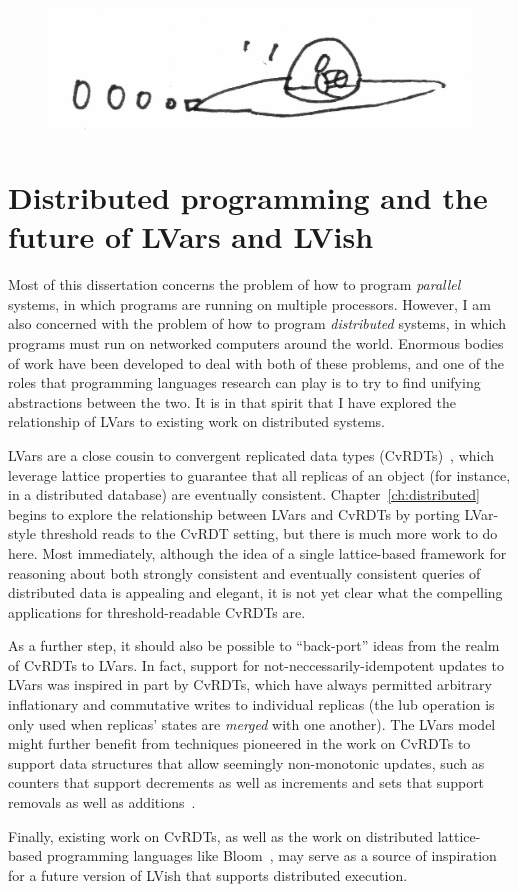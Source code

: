 \ifdefined\DISSERTATION
\begin{figure}[h]
  \vspace{-1em}
  \begin{center}
    \includegraphics[scale=0.15]{../illustrations/flying-saucer}
  \end{center}
  \vspace{-1em}
\end{figure}
\fi

\ifdefined\DISSERTATION
\section{Distributed programming and the future of LVars and LVish}

Most of this dissertation concerns the problem of how to program
\emph{parallel} systems, in which programs are running on multiple
processors.  However, I am also concerned with the problem of how to
program \emph{distributed} systems, in which programs must run on
networked computers around the world.  Enormous bodies of work have
been developed to deal with both of these problems, and one of the
roles that programming languages research can play is to try to find
unifying abstractions between the two. It is in that spirit that I
have explored the relationship of LVars to existing work on
distributed systems.

LVars are a close cousin to convergent replicated data types
(CvRDTs)~\cite{crdts,crdts-tr}, which leverage lattice properties to
guarantee that all replicas of an object (for instance, in a
distributed database) are eventually consistent.
Chapter~\ref{ch:distributed} begins to explore the relationship
between LVars and CvRDTs by porting LVar-style threshold reads to the
CvRDT setting, but there is much more work to do here.  Most
immediately, although the idea of a single lattice-based framework for
reasoning about both strongly consistent and eventually consistent
queries of distributed data is appealing and elegant, it is not yet
clear what the compelling applications for threshold-readable CvRDTs
are.

As a further step, it should also be possible to ``back-port'' ideas
from the realm of CvRDTs to LVars.  In fact, support for
not-neccessarily-idempotent updates to LVars was inspired in part by
CvRDTs, which have always permitted arbitrary inflationary and
commutative writes to individual replicas (the lub operation is only
used when replicas' states are \emph{merged} with one another).  The
LVars model might further benefit from techniques pioneered in the
work on CvRDTs to support data structures that allow seemingly
non-monotonic updates, such as counters that support decrements as
well as increments and sets that support removals as well as
additions~\cite{crdts}.

Finally, existing work on CvRDTs, as well as the work on distributed
lattice-based programming languages like Bloom~\cite{bloom-cidr,
  blooml}, may serve as a source of inspiration for a future version
of LVish that supports distributed execution.
\fi
